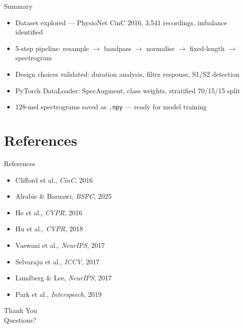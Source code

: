 \documentclass[aspectratio=169, 10pt]{beamer}
\newcommand{\tick}{\textcolor{ok}{$\checkmark$}}
\begin{document}
\begin{frame}{Summary}
  \begin{itemize}
    \setlength\itemsep{7pt}
    \item[\tick] Dataset explored --- PhysioNet CinC 2016, 3,541 recordings, imbalance identified
    \item[\tick] 5-step pipeline: resample $\to$ bandpass $\to$ normalise $\to$ fixed-length $\to$ spectrogram
    \item[\tick] Design choices validated: duration analysis, filter response, S1/S2 detection
    \item[\tick] PyTorch DataLoader: SpecAugment, class weights, stratified 70/15/15 split
    \item[\tick] 128-mel spectrograms saved as \texttt{.npy} --- ready for model training
  \end{itemize}

\end{frame}

\section*{References}

\begin{frame}{References}
\scriptsize

\begin{itemize}
\item Clifford et al., \emph{CinC}, 2016
\item Alrabie \& Barnawi, \emph{BSPC}, 2025
\item He et al., \emph{CVPR}, 2016
\item Hu et al., \emph{CVPR}, 2018
\item Vaswani et al., \emph{NeurIPS}, 2017
\item Selvaraju et al., \emph{ICCV}, 2017
\item Lundberg \& Lee, \emph{NeurIPS}, 2017
\item Park et al., \emph{Interspeech}, 2019
\end{itemize}

\end{frame}

\begin{frame}[standout]
  \Huge Thank You\\[16pt]
  \large Questions?
\end{frame}
\end{document}
